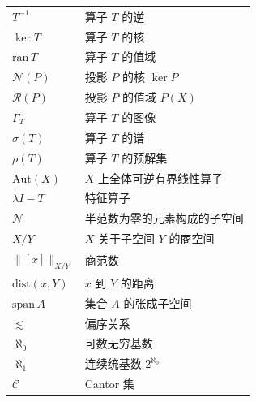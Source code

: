 \documentclass[UTF8]{ctexrep} %
\newcommand{\mcal}[1]{\mathcal{#1}}
\begin{document}
{\begin{longtable}{p{3.2cm}p{\dimexpr\linewidth-3.4cm-4\tabcolsep\relax}}
$T^{-1}$ & 算子 $T$ 的逆 \\
$\ker T$ & 算子 $T$ 的核 \\
$\mathrm{ran}\, T$ & 算子 $T$ 的值域 \\
$\mcal{N}(P)$ & 投影 $P$ 的核 $\ker P$ \\
$\mcal{R}(P)$ & 投影 $P$ 的值域 $P(X)$ \\
$\Gamma_T$ & 算子 $T$ 的图像 \\
$\sigma(T)$ & 算子 $T$ 的谱 \\
$\rho(T)$ & 算子 $T$ 的预解集 \\
$\mathrm{Aut}(X)$ & $X$ 上全体可逆有界线性算子 \\
$\lambda I-T$ & 特征算子 \\ 
$\mcal{N}$ & 半范数为零的元素构成的子空间 \\
$X/Y$ & $X$ 关于子空间 $Y$ 的商空间 \\
$\big\|[x]\big\|_{X/Y}$ & 商范数 \\
$\mathrm{dist}(x,Y)$ & $x$ 到 $Y$ 的距离 \\
$\mathrm{span}\, A$ & 集合 $A$ 的张成子空间 \\
$\lesssim$ & 偏序关系 \\
$\aleph_0$ & 可数无穷基数 \\
$\aleph_1$ & 连续统基数 $2^{\aleph_0}$ \\
$\mcal{C}$ & Cantor 集 \\
\end{longtable}
}
\end{document}
